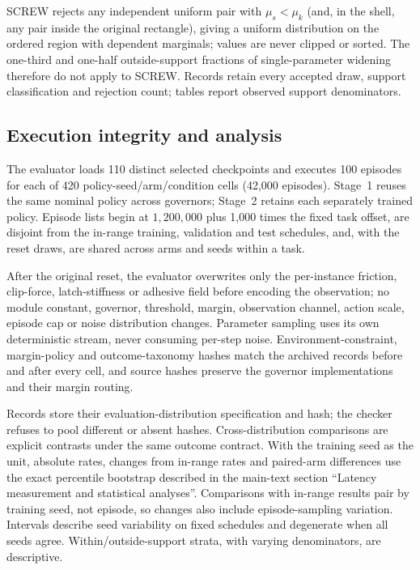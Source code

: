 \documentclass[10pt]{article}
\begin{document}
SCREW rejects any independent uniform pair with $\mu_s<\mu_k$ (and, in the
shell, any pair inside the original rectangle), giving a uniform distribution
on the ordered region with dependent marginals; values are never clipped or
sorted. The one-third and one-half outside-support fractions of single-parameter
widening therefore do not apply to SCREW. Records retain
every accepted draw, support classification and rejection count; tables
report observed support denominators.

\subsection{Execution integrity and analysis}

The evaluator loads 110 distinct selected checkpoints and executes 100
episodes for each of 420 policy-seed/arm/condition cells (42,000
episodes). Stage~1 reuses the same nominal policy across governors; Stage~2
retains each separately trained policy. Episode lists begin at $1{,}200{,}000$ plus
1,000 times the fixed task offset, are disjoint from the in-range training,
validation and test schedules, and, with the reset draws, are shared across
arms and seeds within a task.

After the original reset, the evaluator overwrites only the per-instance
friction, clip-force, latch-stiffness or adhesive field before encoding the
observation; no module constant, governor, threshold, margin, observation
channel, action scale, episode cap or noise distribution changes. Parameter
sampling uses its own deterministic stream, never consuming per-step noise. Environment-constraint, margin-policy and outcome-taxonomy hashes
match the archived records before and after every cell, and source hashes
preserve the governor implementations and their margin routing.

Records store their evaluation-distribution specification and hash; the
checker refuses to pool different or absent hashes. Cross-distribution
comparisons are explicit contrasts under the same outcome contract. With
the training seed as the unit, absolute rates, changes from in-range rates and
paired-arm differences use the exact percentile bootstrap described in the main-text section ``Latency measurement and statistical analyses''. Comparisons with in-range results pair by training seed, not episode,
so changes also include episode-sampling variation. Intervals
describe seed variability on fixed schedules and degenerate when all seeds
agree. Within/outside-support strata, with varying denominators, are descriptive.
\end{document}
